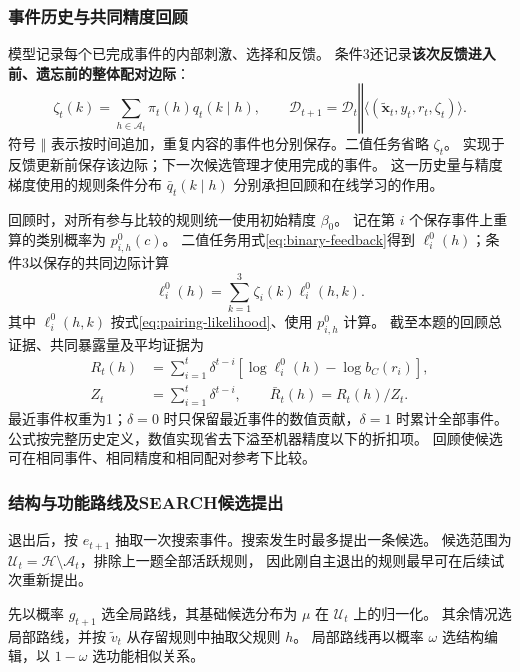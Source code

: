 \documentclass[11pt,a4paper]{article}
\numberwithin{equation}{section}
\newcommand{\A}{\mathcal{A}}
\newcommand{\Hh}{\mathcal{H}}
\begin{document}
\subsubsection{事件历史与共同精度回顾}
\label{sec:recall}
模型记录每个已完成事件的内部刺激、选择和反馈。
条件3还记录\textbf{该次反馈进入前、遗忘前的整体配对边际}：
\begin{equation}
\zeta_t(k)=\sum_{h\in\A_t}\pi_t(h)q_t(k\mid h),\qquad
\mathcal D_{t+1}=\mathcal D_t\mathbin{\Vert}\langle(\widetilde{\bm x}_t,y_t,r_t,\zeta_t)\rangle.
\label{eq:episode}
\end{equation}
符号 $\Vert$ 表示按时间追加，重复内容的事件也分别保存。二值任务省略 $\zeta_t$。
实现于反馈更新前保存该边际；下一次候选管理才使用完成的事件。
这一历史量与精度梯度使用的规则条件分布 $\bar q_t(k\mid h)$ 分别承担回顾和在线学习的作用。

回顾时，对所有参与比较的规则统一使用初始精度 $\beta_0$。
记在第 $i$ 个保存事件上重算的类别概率为 $p_{i,h}^{0}(c)$。
二值任务用式\eqref{eq:binary-feedback}得到 $\ell_i^0(h)$；条件3以保存的共同边际计算
\begin{equation}
\ell_i^0(h)=\sum_{k=1}^{3}\zeta_i(k)\ell_i^0(h,k).
\end{equation}
其中 $\ell_i^0(h,k)$ 按式\eqref{eq:pairing-likelihood}、使用 $p_{i,h}^{0}$ 计算。
截至本题的回顾总证据、共同暴露量及平均证据为
\begin{align}
R_t(h)&=\sum_{i=1}^{t}\delta^{t-i}\left[\log\ell_i^0(h)-\log b_C(r_i)\right],\\
Z_t&=\sum_{i=1}^{t}\delta^{t-i},\qquad \bar R_t(h)=R_t(h)/Z_t.
\label{eq:recall}
\end{align}
最近事件权重为1；$\delta=0$ 时只保留最近事件的数值贡献，$\delta=1$ 时累计全部事件。
公式按完整历史定义，数值实现省去下溢至机器精度以下的折扣项。
回顾使候选可在相同事件、相同精度和相同配对参考下比较。

\subsubsection{结构与功能路线及SEARCH候选提出}
\label{sec:proposal}
退出后，按 $e_{t+1}$ 抽取一次搜索事件。搜索发生时最多提出一条候选。
候选范围为 $\mathcal U_t=\Hh\setminus\A_t$，排除上一题全部活跃规则，
因此刚自主退出的规则最早可在后续试次重新提出。

先以概率 $g_{t+1}$ 选全局路线，其基础候选分布为 $\mu$ 在 $\mathcal U_t$ 上的归一化。
其余情况选局部路线，并按 $\widetilde v_t$ 从存留规则中抽取父规则 $h$。
局部路线再以概率 $\omega$ 选结构编辑，以 $1-\omega$ 选功能相似关系。
\end{document}
